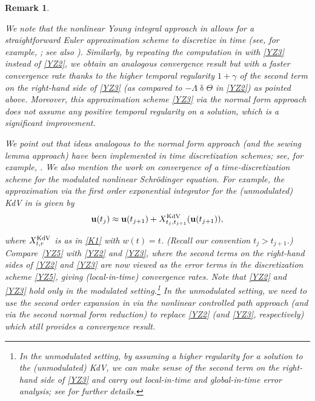 \documentclass[letterpaper, 11pt,  reqno]{amsart}
\newtheorem{remark}[theorem]{Remark}
\newcommand{\1}{\hspace{0.5mm}\text{I}\hspace{0.5mm}}
\newcommand{\noi}{\noindent}
\newcommand{\updl}{\updelta}
\newcommand{\g}{\gamma}
\newcommand{\Ld}{\Lambda}
\newcommand{\uu}{\mathbf{u}}
\newcommand{\Ta}{\Theta}
\newcommand{\KDV}{\text{\rm KdV} }
\numberwithin{equation}{section}
\numberwithin{theorem}{section}
\begin{document}
\begin{remark}\label{REM:num}\rm


We  note that 
the nonlinear Young integral approach in \cite{CG1, CGLLO1, CGLLO2}
allows for a straightforward Euler approximation scheme
to discretize in time (see, for example,  \cite[Subsection~2.3]{CG1};
see also \cite[Subsection 3.3]{GubinelliKdV}).
Similarly, 
by repeating the computation
in \cite[Subsection~2.3]{CG1}
with  \eqref{YZ3} instead of \eqref{YZ2}, 
we obtain an analogous convergence result 
but with a faster convergence rate 
thanks to the higher temporal regularity $1+ \g$
of the second term on the right-hand side of \eqref{YZ3}
(as compared to 
$ - \Ld \updl \Ta$ in \eqref{YZ2}) as pointed above.
Moreover, this approximation scheme \eqref{YZ3} via the normal form approach
does {\it not} assume any positive temporal regularity on a solution,
which is a significant improvement.

We point out that ideas
analogous to the normal form approach 
(and the sewing lemma approach) have been implemented
in time discretization schemes; see, for example, 
\cite{HSch, BSch}.
We also mention 
the work 
\cite{HMSch} on convergence of a time-discretization scheme
for the modulated 
nonlinear Schr\"odinger equation.
For example, 
the approximation via the first order exponential integrator 
for the (unmodulated) KdV 
in \cite{HSch}
is given by 
\begin{align}
 \uu(t_j) 
\approx
 \uu(t_{j+1}) +  X^\KDV_{t_j, t_{j+1}}(\uu (t_{j+1}) ), 
\label{YZ5}
\end{align}

\noi
where $X^\KDV_{t, r}$
is as in 
\eqref{K1} with $w(t) = t$.
(Recall our convention $t_j > t_{j+1}$.)
Compare~\eqref{YZ5} with \eqref{YZ2} and \eqref{YZ3}, 
where the second terms on the right-hand sides of 
\eqref{YZ2} and \eqref{YZ3}
are now viewed as the error terms
in the discretization scheme \eqref{YZ5}, giving (local-in-time) convergence rates.
Note that \eqref{YZ2} and \eqref{YZ3}
hold only in the modulated setting.\footnote{In the unmodulated setting, 
by assuming a higher regularity for a  solution
to the (unmodulated) KdV, 
we can make sense of the second term 
on the right-hand side of \eqref{YZ3}
and carry out local-in-time and global-in-time error analysis;
see \cite{CFO}
for further details.}
In the unmodulated setting, 
we need to use the second order expansion
in \cite{Gub04} via the nonlinear controlled path approach
(and \cite{BIT} via the second normal form reduction)
to replace \eqref{YZ2} (and \eqref{YZ3}, respectively)
which still provides a convergence result.





\end{remark}
\end{document}
